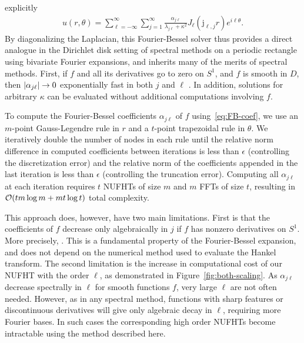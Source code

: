explicitly
\begin{align}
  u(r,\theta) = \sum_{\ell=-\infty}^\infty \sum_{j=1}^\infty \frac{\alpha_{j\ell}}{\lambda_{j\ell} + \kappa^2} J_\ell(\mathrm{j}_{\ell,j}r) e^{i\ell\theta}.
\end{align}
By diagonalizing the Laplacian, this Fourier-Bessel solver thus provides a
direct analogue in the Dirichlet disk setting of spectral methods on a periodic
rectangle using bivariate Fourier expansions, and inherits many of the merits of
spectral methods. First, if $f$ and all its derivatives go to zero on $S^1$, and
$f$ is smooth in $D$, then $\left|\alpha_{j\ell}\right| \to 0$ exponentially fast in
both $j$ and $\ell$ \cite{boyd2011comparing}. In addition, solutions for
arbitrary $\kappa$ can be evaluated without additional computations involving
$f$. 

To compute the Fourier-Bessel coefficients $\alpha_{j\ell}$ of $f$
using~\eqref{eq:FB-coef}, we use an $m$-point Gauss-Legendre rule in $r$ and a
$t$-point trapezoidal rule in $\theta$. We iteratively double the number of
nodes in each rule until the relative norm difference in computed coefficients
between iterations is less than $\epsilon$ (controlling the discretization
error) and the relative norm of the coefficients appended in the last iteration
is less than $\epsilon$ (controlling the truncation error). Computing all
$\alpha_{j\ell}$ at each iteration requires $t$ NUFHTs of size $m$ and $m$ FFTs
of size $t$, resulting in $\mathcal{O}(tm\log m + mt\log t)$ total complexity.

This approach does, however, have two main limitations. First is that the
coefficients of $f$ decrease only algebraically in $j$ if $f$ has nonzero
derivatives on $S^1$. More precisely, .  This is a fundamental property of the
Fourier-Bessel expansion, and does not depend on the numerical method used to
evaluate the Hankel transform. The second limitation is the increase in
computational cost of our NUFHT with the order $\ell$, as demonstrated in
Figure~\ref{fig:both-scaling}. As $\alpha_{j\ell}$ decrease spectrally in $\ell$
for smooth functions $f$, very large $\ell$ are not often needed. However, as in
any spectral method, functions with sharp features or discontinuous derivatives
will give only algebraic decay in $\ell$, requiring more Fourier bases. In such
cases the corresponding high order NUFHTs become intractable using the method
described here. 

